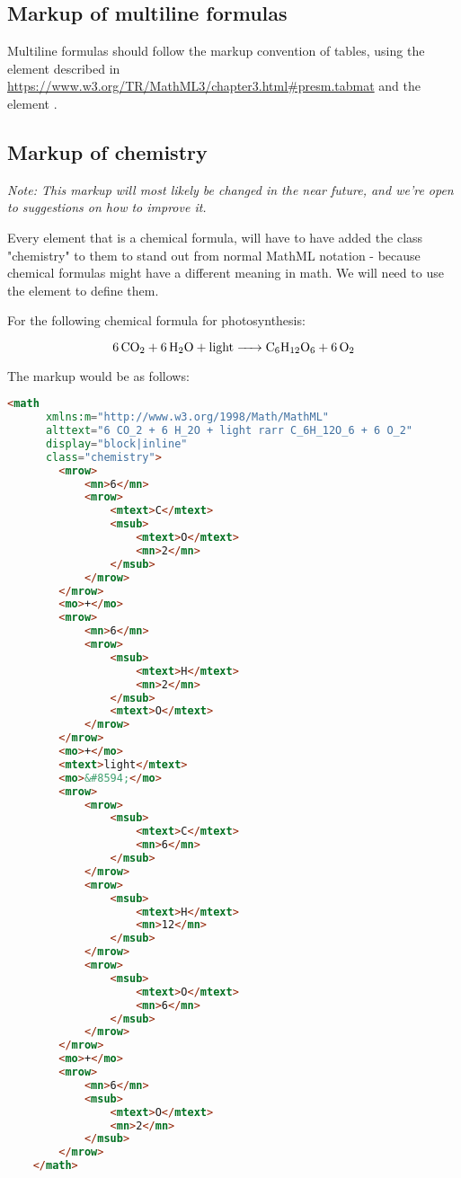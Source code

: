 \documentclass[english,a4paper,11pt]{article}
\begin{document}
\subsection{Markup of multiline formulas}

Multiline formulas should follow the markup convention of tables, using the  element described in \url{https://www.w3.org/TR/MathML3/chapter3.html#presm.tabmat} and the element .

\subsection{Markup of chemistry}\label{chemistry}

\textit{Note: This markup will most likely be changed in the near future, and we're open to suggestions on how to improve it.}

Every  element that is a chemical formula, will have to have added the class "chemistry" to them to stand out from normal MathML notation - because chemical formulas might have a different meaning in math. We will need to use the  element to define them. 

For the following chemical formula for photosynthesis:

\begin{eksempler}
\begin{equation}
    \ce{6 CO_2 + 6 H_2O + light -> C_6H_12O_6 + 6 O_2}
\end{equation}

The markup would be as follows:
\begin{lstlisting}[language=HTML]
	<math 
	  xmlns:m="http://www.w3.org/1998/Math/MathML"
	  alttext="6 CO_2 + 6 H_2O + light rarr C_6H_12O_6 + 6 O_2"
	  display="block|inline"
	  class="chemistry">
		<mrow>
			<mn>6</mn>
			<mrow>
				<mtext>C</mtext>
				<msub>
					<mtext>O</mtext>
					<mn>2</mn>
				</msub>
			</mrow>
		</mrow>
		<mo>+</mo>
		<mrow>
			<mn>6</mn>
			<mrow>
				<msub>
					<mtext>H</mtext>
					<mn>2</mn>
				</msub>
				<mtext>O</mtext>
			</mrow>
		</mrow>
		<mo>+</mo>
		<mtext>light</mtext>
		<mo>&#8594;</mo>
		<mrow>
			<mrow>
				<msub>
					<mtext>C</mtext>
					<mn>6</mn>
				</msub>
			</mrow>
			<mrow>
				<msub>
					<mtext>H</mtext>
					<mn>12</mn>
				</msub>
			</mrow>
			<mrow>
				<msub>
					<mtext>O</mtext>
					<mn>6</mn>
				</msub>
			</mrow>
		</mrow>
		<mo>+</mo>
		<mrow>
			<mn>6</mn>
			<msub>
				<mtext>O</mtext>
				<mn>2</mn>
			</msub>
		</mrow>
	</math>
\end{lstlisting}
\end{eksempler}
\end{document}
